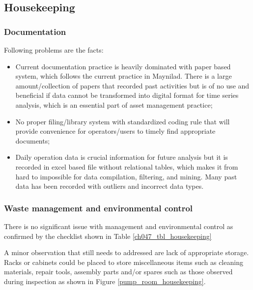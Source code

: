 \subsection{Housekeeping}\label{aq05}
\subsubsection{Documentation}
Following problems are the facts:

\begin{itemize}
\item Current documentation practice is heavily dominated with paper based system, which follows the current practice in Maynilad. There is a large amount/collection of papers that recorded past activities but is of no use and beneficial if data cannot be transformed into digital format for time series analysis, which is an essential part of asset management practice;

\item No proper filing/library system with standardized coding rule that will provide convenience for operators/users to timely find appropriate documents;

\item Daily operation data is crucial information for future analysis but it is recorded in excel based file without relational tables, which makes it from hard to impossible for data compilation, filtering, and mining. Many past data has been recorded with outliers and incorrect data types. 

\end{itemize}

\subsubsection{Waste management and environmental control}
There is no significant issue with management and environmental control as confirmed by the checklist shown in Table \ref{ch047_tbl_housekeeping}

A minor observation that still needs to addressed are lack of appropriate storage. Racks or cabinets could be placed to store miscellaneous items such as cleaning materials, repair tools, assembly parts and/or spares such as those observed during inspection as shown in Figure \ref{pump_room_housekeeping}.

